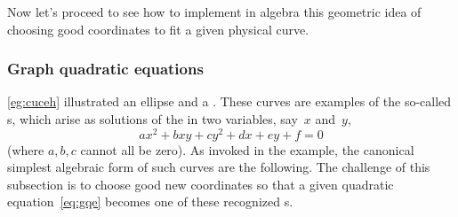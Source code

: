Now let's proceed to see how to implement in algebra this geometric idea of choosing good coordinates to fit a given physical curve. 


\subsubsection{Graph quadratic equations}
\label{sec:gqe}

\cref{eg:cuceh} illustrated an ellipse and a .  These curves are examples of the so-called s, which arise as solutions of the  in two variables, say~\(x\) and~\(y\),
\begin{equation}
ax^2+bxy+cy^2+dx+ey+f=0 \label{eq:gqe}
\end{equation}
(where \(a,b,c\) cannot all be zero).
As invoked in the example, the canonical simplest algebraic form of such curves are the following.
The challenge of this subsection is to choose good new coordinates so that a given quadratic equation~\eqref{eq:gqe} becomes one of these recognized s.
